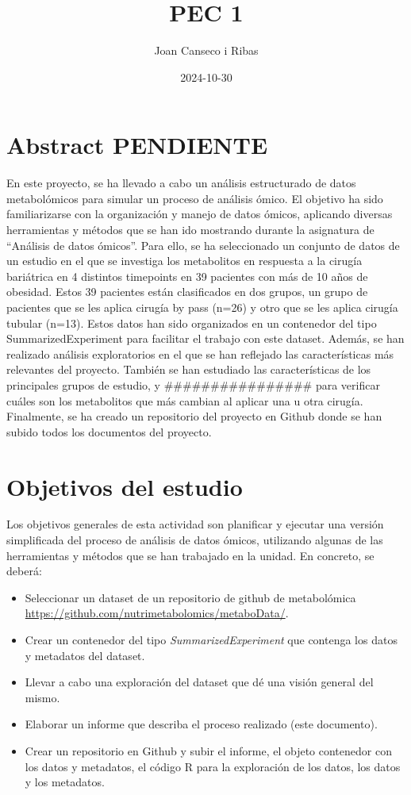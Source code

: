\documentclass[
]{article}
\title{PEC 1}
\author{Joan Canseco i Ribas}
\date{2024-10-30}
\begin{document}
\maketitle

{
\setcounter{tocdepth}{2}
\tableofcontents
}
\section{Abstract PENDIENTE}\label{abstract-pendiente}

En este proyecto, se ha llevado a cabo un análisis estructurado de datos
metabolómicos para simular un proceso de análisis ómico. El objetivo ha
sido familiarizarse con la organización y manejo de datos ómicos,
aplicando diversas herramientas y métodos que se han ido mostrando
durante la asignatura de ``Análisis de datos ómicos''. Para ello, se ha
seleccionado un conjunto de datos de un estudio en el que se investiga
los metabolitos en respuesta a la cirugía bariátrica en 4 distintos
timepoints en 39 pacientes con más de 10 años de obesidad. Estos 39
pacientes están clasificados en dos grupos, un grupo de pacientes que se
les aplica cirugía by pass (n=26) y otro que se les aplica cirugía
tubular (n=13). Estos datos han sido organizados en un contenedor del
tipo SummarizedExperiment para facilitar el trabajo con este dataset.
Además, se han realizado análisis exploratorios en el que se han
reflejado las características más relevantes del proyecto. También se
han estudiado las características de los principales grupos de estudio,
y \#\#\#\#\#\#\#\#\#\#\#\#\#\#\#\# para verificar cuáles son los
metabolitos que más cambian al aplicar una u otra cirugía. Finalmente,
se ha creado un repositorio del proyecto en Github donde se han subido
todos los documentos del proyecto.

\section{Objetivos del estudio}\label{objetivos-del-estudio}

Los objetivos generales de esta actividad son planificar y ejecutar una
versión simplificada del proceso de análisis de datos ómicos, utilizando
algunas de las herramientas y métodos que se han trabajado en la unidad.
En concreto, se deberá:

\begin{itemize}
\item
  Seleccionar un dataset de un repositorio de github de metabolómica
  \url{https://github.com/nutrimetabolomics/metaboData/}.
\item
  Crear un contenedor del tipo \emph{SummarizedExperiment} que contenga
  los datos y metadatos del dataset.
\item
  Llevar a cabo una exploración del dataset que dé una visión general
  del mismo.
\item
  Elaborar un informe que describa el proceso realizado (este
  documento).
\item
  Crear un repositorio en Github y subir el informe, el objeto
  contenedor con los datos y metadatos, el código R para la exploración
  de los datos, los datos y los metadatos.
\end{itemize}
\end{document}
